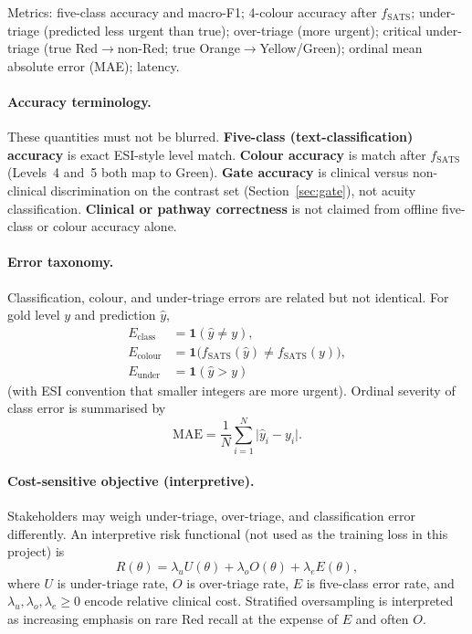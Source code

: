 Metrics: five-class accuracy and macro-F1; 4-colour accuracy after \(f_{\mathrm{SATS}}\); under-triage (predicted less urgent than true); over-triage (more urgent); critical under-triage (true Red\(\rightarrow\)non-Red; true Orange\(\rightarrow\)Yellow/Green); ordinal mean absolute error (MAE); latency.

\paragraph{Accuracy terminology.}
These quantities must not be blurred. \textbf{Five-class (text-classification) accuracy} is exact ESI-style level match. \textbf{Colour accuracy} is match after \(f_{\mathrm{SATS}}\) (Levels~4 and~5 both map to Green). \textbf{Gate accuracy} is clinical versus non-clinical discrimination on the contrast set (Section~\ref{sec:gate}), not acuity classification. \textbf{Clinical or pathway correctness} is not claimed from offline five-class or colour accuracy alone.

\paragraph{Error taxonomy.}
Classification, colour, and under-triage errors are related but not identical. For gold level \(y\) and prediction \(\hat{y}\),
\begin{align*}
  E_{\mathrm{class}} &= \mathbf{1}(\hat{y}\neq y), \\
  E_{\mathrm{colour}} &= \mathbf{1}\bigl(f_{\mathrm{SATS}}(\hat{y})\neq f_{\mathrm{SATS}}(y)\bigr), \\
  E_{\mathrm{under}} &= \mathbf{1}(\hat{y}> y)
\end{align*}
(with ESI convention that smaller integers are more urgent). Ordinal severity of class error is summarised by
\[
  \mathrm{MAE}=\frac{1}{N}\sum_{i=1}^{N}\lvert\hat{y}_i-y_i\rvert.
\]

\paragraph{Cost-sensitive objective (interpretive).}
Stakeholders may weigh under-triage, over-triage, and classification error differently. An interpretive risk functional (not used as the training loss in this project) is
\[
  R(\theta)=\lambda_u U(\theta)+\lambda_o O(\theta)+\lambda_e E(\theta),
\]
where \(U\) is under-triage rate, \(O\) is over-triage rate, \(E\) is five-class error rate, and \(\lambda_u,\lambda_o,\lambda_e\ge 0\) encode relative clinical cost. Stratified oversampling is interpreted as increasing emphasis on rare Red recall at the expense of \(E\) and often \(O\).

